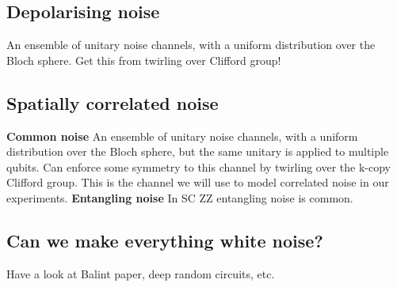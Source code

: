     \subsection{Depolarising noise}
        An ensemble of unitary noise channels, with a uniform distribution over the Bloch sphere.
        Get this from twirling over Clifford group!
    \subsection{Spatially correlated noise}
        \indent\textbf{Common noise}
            An ensemble of unitary noise channels, with a uniform distribution over the Bloch sphere, but the same unitary is applied to multiple qubits. Can enforce some symmetry to this channel by twirling over the k-copy Clifford group. This is the channel we will use to model correlated noise in our experiments.
        \indent\textbf{Entangling noise}
            In SC ZZ entangling noise is common.
    \subsection{Can we make everything white noise?}
        Have a look at Balint paper, deep random circuits, etc.
